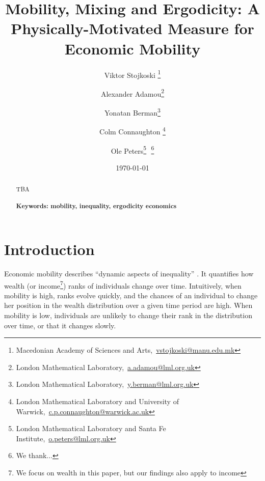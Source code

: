 \documentclass[11pt]{article}
\newcommand{\bc}{\begin{center}}
\newcommand{\ec}{\end{center}}
\newcommand{\red}[1]{{\color{red} #1}}
\numberwithin{equation}{section}
\begin{document}
\begin{titlepage}
\title{Mobility, Mixing and Ergodicity: A Physically-Motivated Measure for Economic Mobility}
\author{Viktor Stojkoski \footnote{Macedonian Academy of Sciences and Arts,~\url{vstojkoski@manu.edu.mk}} \and Alexander Adamou\footnote{London Mathematical Laboratory,~\url{a.adamou@lml.org.uk}} \and Yonatan Berman\footnote{London Mathematical Laboratory,~\url{y.berman@lml.org.uk}} \and Colm Connaughton \footnote{London Mathematical Laboratory and University of Warwick,~\url{c.p.connaughton@warwick.ac.uk}} \and Ole Peters\footnote{London Mathematical Laboratory and Santa Fe Institute,~\url{o.peters@lml.org.uk}}\,\, \thanks{We thank...}}
\date{\today}
\maketitle
\begin{abstract}
TBA
\\
\\
\noindent\textbf{Keywords: mobility, inequality, ergodicity economics}
\end{abstract}
\setcounter{page}{0}
\thispagestyle{empty}
\end{titlepage}
\pagebreak \newpage
\section{Introduction}\label{sec:introduction}
Economic mobility describes ``dynamic aspects of inequality'' \citep{Shorrocks1978}. It quantifies how wealth (or income\footnote{We focus on wealth in this paper, but our findings also apply to income}) ranks of individuals change over time. Intuitively, when mobility is high, ranks evolve quickly, and the chances of an individual to change her position in the wealth distribution over a given time period are high. When mobility is low, individuals are unlikely to change their rank in the distribution over time, or that it changes slowly.
\end{document}
